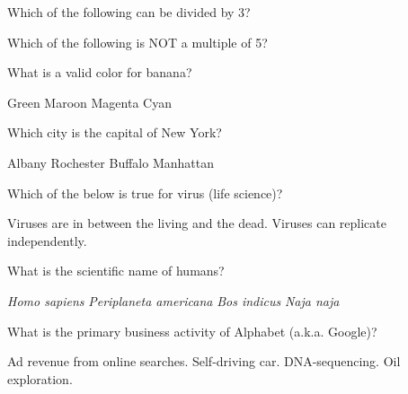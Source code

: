 \documentclass[12pt]{exam}
\begin{document}
\begin{questions}
        \question Which of the following can be divided by 3?
        \begin{oneparchoices}
        \end{oneparchoices} 

        \question Which of the following is NOT a multiple of 5?   
        \begin{oneparchoices}
        \end{oneparchoices} 

        \question What is a valid color for banana?   
        \begin{oneparchoices}
            \CorrectChoice Green  
            \choice Maroon
            \choice Magenta
            \choice Cyan
        \end{oneparchoices} 

        \question Which city is the capital of New York?   
        \begin{oneparchoices}
            \CorrectChoice Albany  
            \choice Rochester
            \choice Buffalo
            \choice Manhattan
        \end{oneparchoices} 

        \question Which of the below is true for virus (life science)?   
        \begin{oneparchoices}
            \CorrectChoice Viruses are in between the living and the dead.  
            \choice Viruses can replicate independently.

        \end{oneparchoices} 

        \question What is the scientific name of humans?   
        \begin{oneparchoices}
            \CorrectChoice \textit{Homo sapiens}
            \choice \textit{Periplaneta americana}
            \choice \textit{Bos indicus}
            \choice \textit{Naja naja}
        \end{oneparchoices} 

        \question What is the primary business activity of Alphabet (a.k.a. Google)?   
        \begin{oneparchoices}
            \CorrectChoice Ad revenue from online searches.  
            \choice Self-driving car.
            \choice DNA-sequencing.
            \choice Oil exploration.
        \end{oneparchoices} 
    \end{questions}
\end{document}

